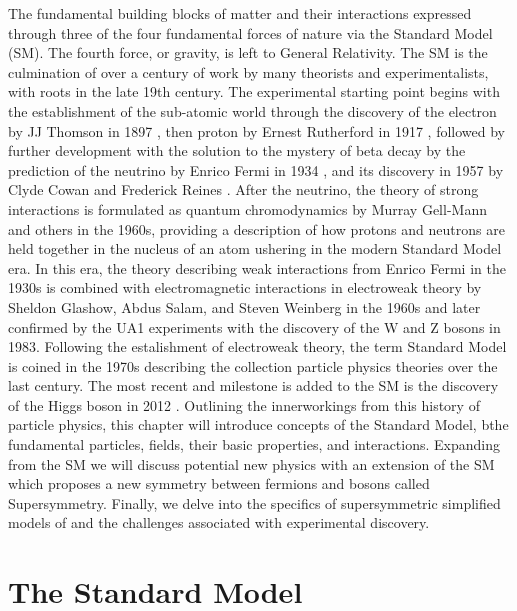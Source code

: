 The fundamental building blocks of matter and their interactions expressed through three of the four fundamental forces of nature via the Standard Model (SM). The fourth force, or gravity, is left to General Relativity. The SM  is the culmination of over a century of work by many theorists and experimentalists, with roots in the late 19th century. The experimental starting point begins with the establishment of the sub-atomic world through the discovery of the electron by JJ Thomson in 1897 \cite{Thomson:1897cm}, then proton by Ernest Rutherford in 1917 \cite{Rutherford:1911zz}, followed by further development with the solution to the mystery of beta decay by the prediction of the neutrino by Enrico Fermi in 1934 \cite{Fermi:1934hr}, and its discovery in 1957 by Clyde Cowan and Frederick Reines \cite{Reines:1956rs}.  After the neutrino,  the theory of strong interactions is formulated as quantum chromodynamics by Murray Gell-Mann and others in the 1960s, providing a description of how protons and neutrons are held together in the nucleus of an atom \cite{GellMann:1964nj} ushering in the modern Standard Model era. In this era, the theory describing weak interactions from Enrico Fermi in the 1930s is combined with electromagnetic interactions in electroweak theory by Sheldon Glashow, Abdus Salam, and Steven Weinberg in the 1960s \cite{GLASHOW1961579}\cite{Salam:1968rm}\cite{Weinberg:1967tq} and later confirmed by the UA1 experiments with the discovery of the W and Z bosons in 1983\cite{arnison1983experimental}\cite{glashow1984future}. Following the estalishment of electroweak theory, the term Standard Model is coined in the 1970s describing the collection particle physics theories over the last century. The most recent and milestone is added to the SM is the discovery of the Higgs boson in 2012 \cite{hCMS:2012qbp}\cite{ATLAS:2012yve}.  Outlining the innerworkings from this history of particle physics, this chapter will introduce concepts of the Standard Model, bthe fundamental particles, fields, their basic properties, and interactions. Expanding from the  SM we will discuss potential new physics with an extension of the SM which proposes a new symmetry between fermions and bosons called Supersymmetry. Finally, we delve into the specifics of supersymmetric simplified models of and the challenges associated with experimental discovery.



\section{The Standard Model}

